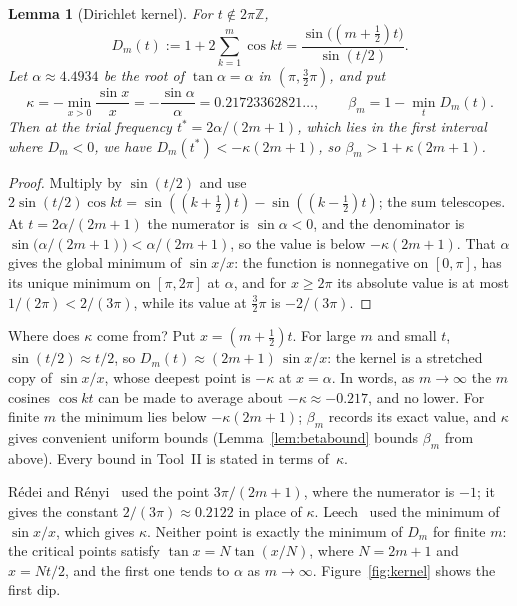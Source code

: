 \documentclass[11pt]{amsart}
\theoremstyle{tplain}
\newtheorem{lemma}[theorem]{Lemma}
\theoremstyle{tdefinition}
\theoremstyle{tremark}
\newcommand{\ZZ}{\mathbb Z}
\begin{document}
\begin{lemma}[Dirichlet kernel]\label{lem:dirichlet}
For $t\notin2\pi\ZZ$,
\[
  D_m(t):=1+2\sum_{k=1}^m\cos kt=\frac{\sin\bigl((m+\frac12)t\bigr)}{\sin(t/2)}.
\]
Let $\alpha\approx4.4934$ be the root of $\tan\alpha=\alpha$ in
$(\pi,\frac32\pi)$, and put
\[
  \kappa=-\min_{x>0}\frac{\sin x}{x}=-\frac{\sin\alpha}{\alpha}=0.21723362821\ldots,\qquad
  \beta_m=1-\min_tD_m(t).
\]
Then at the \emph{trial frequency} $t^*=2\alpha/(2m+1)$, which lies in the
first interval where $D_m<0$, we have
$D_m(t^*)<-\kappa(2m+1)$, so $\beta_m>1+\kappa(2m+1)$.
\end{lemma}

\begin{proof}
Multiply by $\sin(t/2)$ and use
$2\sin(t/2)\cos kt=\sin((k+\frac12)t)-\sin((k-\frac12)t)$; the sum telescopes.
At $t=2\alpha/(2m+1)$ the numerator is $\sin\alpha<0$, and the denominator is
$\sin\bigl(\alpha/(2m+1)\bigr)<\alpha/(2m+1)$, so the value is below
$-\kappa(2m+1)$. That $\alpha$ gives the global minimum of $\sin x/x$: the
function is nonnegative on $[0,\pi]$, has its unique minimum on $[\pi,2\pi]$
at $\alpha$, and for $x\ge2\pi$ its absolute value is at most
$1/(2\pi)<2/(3\pi)$, while its value at $\frac32\pi$ is $-2/(3\pi)$.
\end{proof}

Where does $\kappa$ come from? Put $x=(m+\frac12)t$. For large $m$ and small
$t$, $\sin(t/2)\approx t/2$, so $D_m(t)\approx(2m+1)\,\sin x/x$: the kernel is
a stretched copy of $\sin x/x$, whose deepest point is $-\kappa$ at
$x=\alpha$. In words, as $m\to\infty$ the $m$ cosines $\cos kt$ can be made to average
about $-\kappa\approx-0.217$, and no lower. For finite $m$ the minimum lies below $-\kappa(2m+1)$; $\beta_m$ records its
exact value, and $\kappa$ gives
convenient uniform bounds (Lemma~\ref{lem:betabound} bounds $\beta_m$ from
above). Every bound in Tool~II is stated in terms of~$\kappa$.

R\'edei and R\'enyi~\cite{rr} used the point $3\pi/(2m+1)$, where the
numerator is $-1$; it gives the constant $2/(3\pi)\approx0.2122$ in place of
$\kappa$. Leech~\cite{leech} used the minimum of $\sin x/x$, which gives
$\kappa$. Neither point is exactly the minimum of $D_m$ for finite $m$: the
critical points satisfy $\tan x=N\tan(x/N)$, where $N=2m+1$ and $x=Nt/2$, and
the first one tends to $\alpha$ as $m\to\infty$. Figure~\ref{fig:kernel} shows the first dip.
\end{document}

